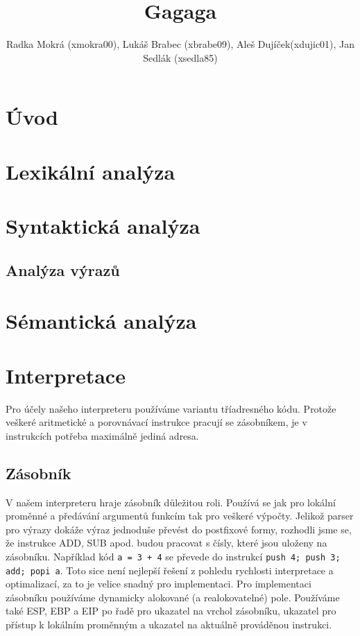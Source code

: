 \documentclass[a4paper,11pt,titlepage]{article}
\author{Radka Mokrá (xmokra00), Lukáš Brabec (xbrabe09), Aleš Dujíček(xdujic01), Jan Sedlák (xsedla85)}
\title{Gagaga}
\begin{document}


\tableofcontents

\newpage

\section{Úvod}

\section{Lexikální analýza}

\section{Syntaktická analýza}

\subsection{Analýza výrazů}


\section{Sémantická analýza}

\section{Interpretace}
Pro účely našeho interpreteru používáme variantu tříadresného kódu. Pro\-to\-že veškeré aritmetické a porovnávací instrukce pracují se zásobníkem, je v instrukcích potřeba maximálně jediná adresa.
\subsection{Zásobník}
V našem interpreteru hraje zásobník důležitou roli. Používá se jak pro lokální proměnné a předávání argumentů funkcím tak pro veškeré výpočty. Jelikož parser pro výrazy dokáže výraz jednoduše převést do postfixové formy, rozhodli jsme se, že instrukce ADD, SUB apod. budou pracovat s čísly, které jsou uloženy na zásobníku. Například kód {\tt a = 3 + 4} se převede do instrukcí {\tt push 4; push 3; add; popi a}. Toto sice není nejlepší řešení z pohledu rychlosti interpretace a optimalizací, za to je velice snadný pro implementaci. Pro implementaci zásobníku používáme dynamicky alokované (a realokovatelné) pole. Používáme také  ESP, EBP a EIP po řadě pro ukazatel na vrchol zásobníku, ukazatel pro přístup k lokálním proměnným a ukazatel na aktuálně prováděnou instrukci.
\end{document}
